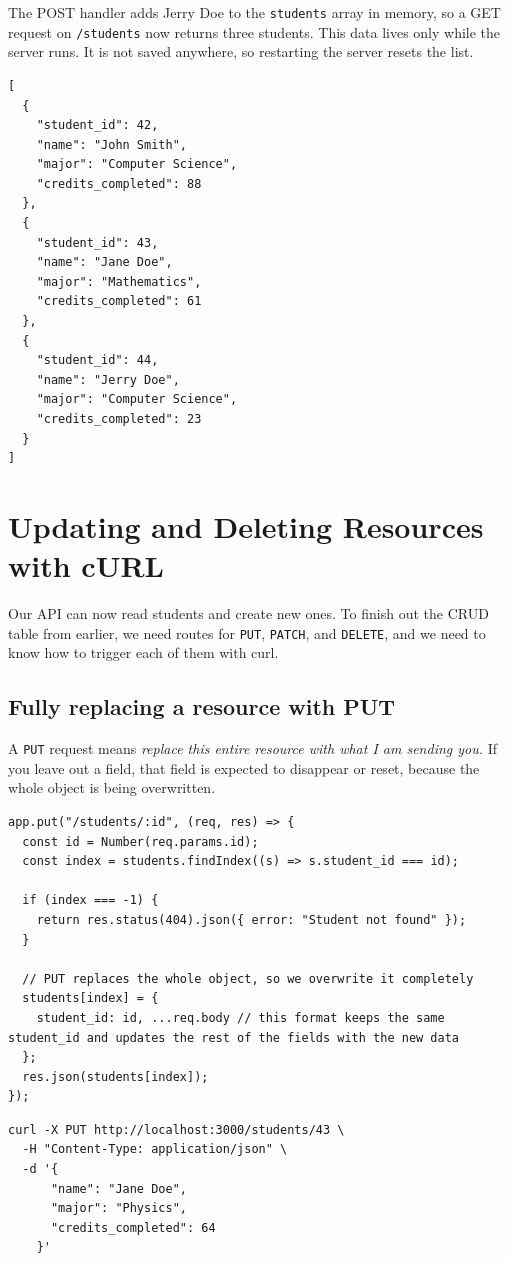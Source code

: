 The POST handler adds Jerry Doe to the \texttt{students} array in memory, so a GET request on \texttt{/students} now returns three students. This data lives only while the server runs. It is not saved anywhere, so restarting the server resets the list.

\begin{verbatim}
[
  {
    "student_id": 42,
    "name": "John Smith",
    "major": "Computer Science",
    "credits_completed": 88
  },
  {
    "student_id": 43,
    "name": "Jane Doe",
    "major": "Mathematics",
    "credits_completed": 61
  },
  {
    "student_id": 44,
    "name": "Jerry Doe",
    "major": "Computer Science",
    "credits_completed": 23
  }
]
\end{verbatim}


\section{Updating and Deleting Resources with cURL}

Our API can now read students and create new ones. To finish out
the CRUD table from earlier, we need routes for \texttt{PUT},
\texttt{PATCH}, and \texttt{DELETE}, and we need to know how to
trigger each of them with curl.

\subsection{Fully replacing a resource with PUT}

A \texttt{PUT} request means \emph{replace this entire resource with
  what I am sending you.} If you leave out a field, that field is
expected to disappear or reset, because the whole object is being
overwritten.

\begin{verbatim}
app.put("/students/:id", (req, res) => {
  const id = Number(req.params.id);
  const index = students.findIndex((s) => s.student_id === id);
 
  if (index === -1) {
    return res.status(404).json({ error: "Student not found" });
  }
 
  // PUT replaces the whole object, so we overwrite it completely
  students[index] = { 
    student_id: id, ...req.body // this format keeps the same student_id and updates the rest of the fields with the new data
  }; 
  res.json(students[index]);
});
\end{verbatim}

\begin{verbatim}
curl -X PUT http://localhost:3000/students/43 \
  -H "Content-Type: application/json" \
  -d '{
      "name": "Jane Doe",
      "major": "Physics",
      "credits_completed": 64
    }'
\end{verbatim}


